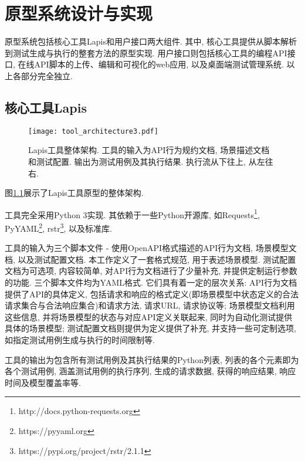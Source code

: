 \chapter{原型系统设计与实现}

    原型系统包括核心工具Lapis和用户接口两大组件. 其中, 核心工具提供从脚本解析到测试生成与执行的整套方法的原型实现. 用户接口则包括核心工具的编程API接口, 在线API脚本的上传、编辑和可视化的web应用, 以及桌面端测试管理系统. 以上各部分完全独立.

	\section{核心工具Lapis}
	
	    \begin{figure}[!htb]
	        \centering
	        \texttt{[image: tool\_architecture3.pdf]}
	        \caption{Lapis工具整体架构. 工具的输入为API行为规约文档, 场景描述文档和测试配置. 输出为测试用例及其执行结果. 执行流从下往上, 从左往右.}
	        \label{fig:lapis_arch}
	    \end{figure}
	    
	    图\ref{fig:lapis_arch}展示了Lapis工具原型的整体架构.
	    
	    工具完全采用Python 3实现. 其依赖于一些Python开源库, 如Requests\footnote{http://docs.python-requests.org}, PyYAML\footnote{https://pyyaml.org}, rstr\footnote{https://pypi.org/project/rstr/2.1.1}, 以及标准库.
	    
	    工具的输入为三个脚本文件 - 使用OpenAPI格式描述的API行为文档, 场景模型文档, 以及测试配置文档. 本工作定义了一套格式规范, 用于表述场景模型. 测试配置文档为可选项, 内容较简单, 对API行为文档进行了少量补充, 并提供定制运行参数的功能. 三个脚本文件均为YAML格式. 它们具有着一定的层次关系: API行为文档提供了API的具体定义, 包括请求和响应的格式定义(即场景模型中状态定义的合法请求集合与合法响应集合)和请求方法, 请求URL, 请求协议等; 场景模型文档利用这些信息, 并将场景模型的状态与对应API定义关联起来, 同时为自动化测试提供具体的场景模型; 测试配置文档则提供为定义提供了补充, 并支持一些可定制选项, 如指定测试用例生成与执行的时间限制等.
	    
	    \label{sec:lapis_impl}
	    工具的输出为包含所有测试用例及其执行结果的Python列表, 列表的各个元素即为各个测试用例, 涵盖测试用例的执行序列, 生成的请求数据, 获得的响应结果, 响应时间及模型覆盖率等.

